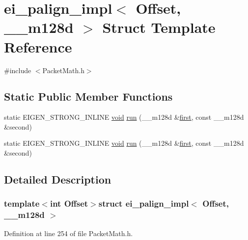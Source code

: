 \hypertarget{structei__palign__impl_3_01_offset_00_01____m128d_01_4}{\section{ei\-\_\-palign\-\_\-impl$<$ Offset, \-\_\-\-\_\-m128d $>$ Struct Template Reference}
\label{structei__palign__impl_3_01_offset_00_01____m128d_01_4}
}


{\ttfamily \#include $<$Packet\-Math.\-h$>$}

\subsection*{Static Public Member Functions}
\begin{DoxyCompactItemize}
\item 
static E\-I\-G\-E\-N\-\_\-\-S\-T\-R\-O\-N\-G\-\_\-\-I\-N\-L\-I\-N\-E \hyperlink{group___u_a_v_objects_plugin_ga444cf2ff3f0ecbe028adce838d373f5c}{void} \hyperlink{structei__palign__impl_3_01_offset_00_01____m128d_01_4_a46caa4a58f5efd2c623383f82e6755ad}{run} (\-\_\-\-\_\-m128d \&\hyperlink{glext_8h_a970a385f6f880f2b620451db4ca4299a}{first}, const \-\_\-\-\_\-m128d \&second)
\item 
static E\-I\-G\-E\-N\-\_\-\-S\-T\-R\-O\-N\-G\-\_\-\-I\-N\-L\-I\-N\-E \hyperlink{group___u_a_v_objects_plugin_ga444cf2ff3f0ecbe028adce838d373f5c}{void} \hyperlink{structei__palign__impl_3_01_offset_00_01____m128d_01_4_a46caa4a58f5efd2c623383f82e6755ad}{run} (\-\_\-\-\_\-m128d \&\hyperlink{glext_8h_a970a385f6f880f2b620451db4ca4299a}{first}, const \-\_\-\-\_\-m128d \&second)
\end{DoxyCompactItemize}


\subsection{Detailed Description}
\subsubsection*{template$<$int Offset$>$struct ei\-\_\-palign\-\_\-impl$<$ Offset, \-\_\-\-\_\-m128d $>$}



Definition at line 254 of file Packet\-Math.\-h.



